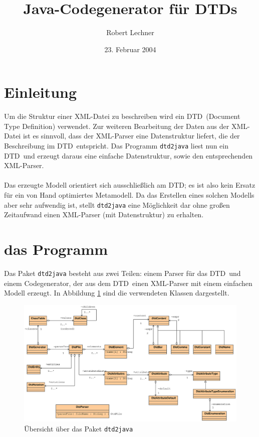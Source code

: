 \documentclass [a4paper,12pt] {scrartcl}
\author{Robert Lechner}
\title{Java-Codegenerator f{\"u}r DTDs}
\date{23. Februar 2004}
\newcommand{\DTD}{{\sffamily\small DTD}}
\newcommand{\XML}{{\sffamily\small XML}}
\begin{document}
\maketitle
\section{Einleitung}
Um die Struktur einer \XML-Datei zu beschreiben wird ein \DTD\ (Document Type Definition)
verwendet. Zur weiteren Bearbeitung der Daten aus der \XML-Datei ist es sinnvoll,
dass der \XML-Parser eine Datenstruktur liefert, die der Beschreibung im \DTD\ entspricht.
Das Programm \texttt{dtd2java} liest nun ein \DTD\ und erzeugt daraus eine einfache
Datenstruktur, sowie den entsprechenden \XML-Parser.\\
~\\
Das erzeugte Modell orientiert sich ausschlie{\ss}lich am \DTD; es ist also kein Ersatz
f{\"u}r ein von Hand optimiertes Metamodell. Da das Erstellen eines solchen Modells aber
sehr aufwendig ist, stellt \texttt{dtd2java} eine M{\"o}glichkeit dar ohne gro{\ss}en
Zeitaufwand einen \XML-Parser (mit Datenstruktur) zu erhalten.

\section{das Programm}
Das Paket \texttt{dtd2java} besteht aus zwei Teilen:
einem Parser f{\"u}r das \DTD\ und einem Codegenerator,
der aus dem \DTD\ einen \XML-Parser mit einem einfachen Modell erzeugt.
In Abbildung \ref{fig:classes} sind die verwendeten Klassen dargestellt.
\begin{figure}[h]
\centerline{\includegraphics[width=1.2 \linewidth]{classes.eps}}
\caption{{\"U}bersicht {\"u}ber das Paket \texttt{dtd2java}}
\label{fig:classes}
\end{figure}
\end{document}
